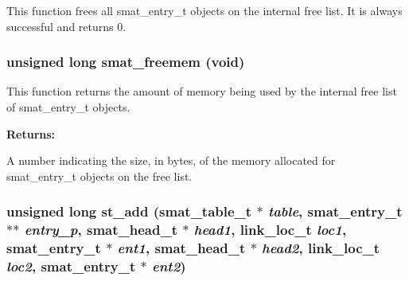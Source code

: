  This function frees all smat\_\-entry\_\-t objects on the internal free list. It is always successful and returns 0. 
\subsubsection{\setlength{\rightskip}{0pt plus 5cm}unsigned long smat\_\-freemem (void)}\label{group__dbprim__smat_a8}




 This function returns the amount of memory being used by the internal free list of smat\_\-entry\_\-t objects.

\begin{Desc}
\item[{\bf Returns: }]\par
A number indicating the size, in bytes, of the memory allocated for smat\_\-entry\_\-t objects on the free list. \end{Desc}
\subsubsection{\setlength{\rightskip}{0pt plus 5cm}unsigned long st\_\-add ({\bf smat\_\-table\_\-t} $\ast$ {\em table}, {\bf smat\_\-entry\_\-t} $\ast$$\ast$ {\em entry\_\-p}, {\bf smat\_\-head\_\-t} $\ast$ {\em head1}, {\bf link\_\-loc\_\-t} {\em loc1}, {\bf smat\_\-entry\_\-t} $\ast$ {\em ent1}, {\bf smat\_\-head\_\-t} $\ast$ {\em head2}, {\bf link\_\-loc\_\-t} {\em loc2}, {\bf smat\_\-entry\_\-t} $\ast$ {\em ent2})}\label{group__dbprim__smat_a10}




